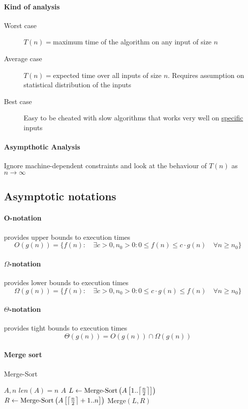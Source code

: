 \documentclass{article}
\DeclarePairedDelimiter{\ceil}{\lceil}{\rceil}
\begin{document}
\paragraph{Kind of analysis}
\begin{description}
\item[Worst case] $T(n)=$maximum time of the algorithm on any input of size $n$
\item[Average case] $T(n)=$expected time over all inputs of size $n$. Requires assumption on statistical distribution of the inputs
\item[Best case] Easy to be cheated with slow algorithms that works very well on \underline{specific} inputs
\end{description}

\paragraph{Asympthotic Analysis} Ignore machine-dependent constraints and look at the behaviour of $T(n)$ as $n \rightarrow \infty$

\subsection{Asymptotic notations}
\paragraph{O-notation} provides upper bounds to execution times
\[
O(g(n)) = 
\{ 
f(n): 
\quad \exists c>0, n_0>0 :
0 \leq f(n) \leq c \cdot g(n) 
\quad \forall n \geq n_0 
\}
\]
\paragraph{$\Omega$-notation} provides lower bounds to execution times
\[
\Omega(g(n)) = 
\{
f(n):
\quad \exists c>0, n_0>0 :
0 \leq c \cdot g(n) \leq f(n)
\quad \forall n \geq n_0
\}
\]
\paragraph{$\Theta$-notation} provides tight bounds to execution times
\[\Theta(g(n))=O(g(n)) \cap \Omega(g(n))\]

\paragraph{Merge sort}
\begin{algorithm}
\caption{Merge-Sort}
\begin{algorithmic}
\REQUIRE $A, n$
\REQUIRE $len(A)=n$
	\RETURN $A$
\ENDIF
\STATE $L \leftarrow \text{Merge-Sort}\left(A\left[1..\ceil*{\frac{n}{2}}\right]\right)$
\STATE $R \leftarrow \text{Merge-Sort}\left(A\left[\ceil*{\frac{n}{2}}+1..n\right]\right)$
\RETURN Merge$(L,R)$
\end{algorithmic}
\end{algorithm}
\end{document}
